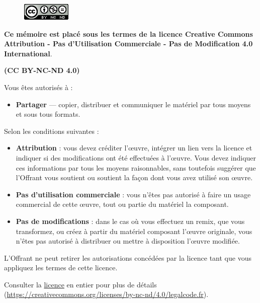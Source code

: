 \begin{figure}
    \centering
    \includegraphics{img/cc-icon}
    \label{fig:licence}
\end{figure}

\begin{center}
    \textbf{Ce mémoire est placé sous les termes de la licence Creative Commons Attribution - Pas d'Utilisation Commerciale - Pas de Modification 4.0 International}.
    
    \bigskip
    
    \textbf{(CC BY-NC-ND 4.0)}
\end{center}

\bigskip

    Vous êtes autorisés à :
    \begin{itemize}
        \item \textbf{Partager} --- copier, distribuer et communiquer le matériel par tous moyens et sous tous formats.
    \end{itemize}

\bigskip

    Selon les conditions suivantes :
    \begin{itemize}
        \item \textbf{Attribution} : vous devez créditer l'\oe{}uvre, intégrer un lien vers la licence et indiquer si des modifications ont été effectuées à l'\oe{}uvre. Vous devez indiquer ces informations par tous les moyens raisonnables, sans toutefois suggérer que l'Offrant vous soutient ou soutient la façon dont vous avez utilisé son \oe{}uvre.
        \item \textbf{Pas d'utilisation commerciale} : vous n'êtes pas autorisé à faire un usage commercial de cette \oe{}uvre, tout ou partie du matériel la composant. 
        \item \textbf{Pas de modifications} : dans le cas où vous effectuez un remix, que vous transformez, ou créez à partir du matériel composant l'\oe{}uvre originale, vous n'êtes pas autorisé à distribuer ou mettre à disposition l'\oe{}uvre modifiée. 
    \end{itemize}

\bigskip

L'Offrant ne peut retirer les autorisations concédées par la licence tant que vous appliquez les termes de cette licence.

\bigskip

    Consulter la \href{https://creativecommons.org/licenses/by-nc-nd/4.0/legalcode.fr}{licence} en entier pour plus de détails (\url{https://creativecommons.org/licenses/by-nc-nd/4.0/legalcode.fr}). 